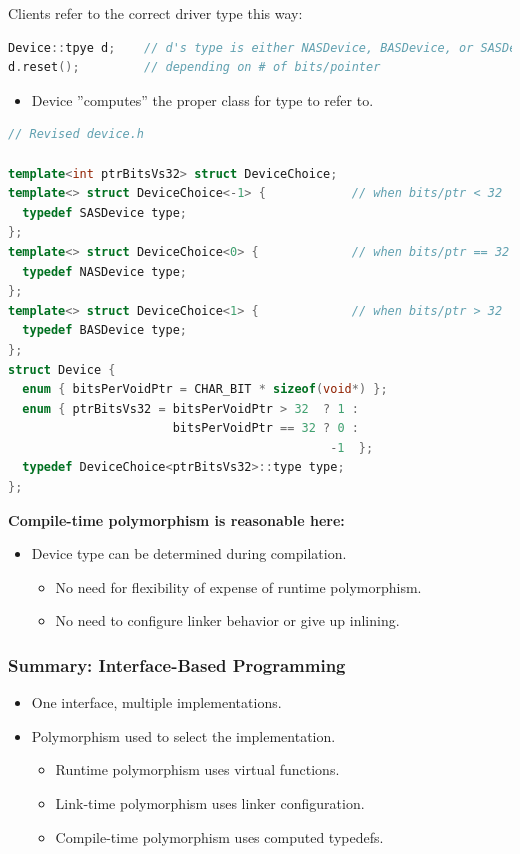 Clients refer to the correct driver type this way:
\begin{lstlisting}[language=C++]
Device::tpye d;    // d's type is either NASDevice, BASDevice, or SASDevice,
d.reset();         // depending on # of bits/pointer
\end{lstlisting}
\begin{itemize}
  \item Device ''computes'' the proper class for type to refer to.
\end{itemize}
\begin{lstlisting}[language=C++]
// Revised device.h

template<int ptrBitsVs32> struct DeviceChoice;
template<> struct DeviceChoice<-1> {            // when bits/ptr < 32
  typedef SASDevice type;
};
template<> struct DeviceChoice<0> {             // when bits/ptr == 32
  typedef NASDevice type;
};
template<> struct DeviceChoice<1> {             // when bits/ptr > 32
  typedef BASDevice type;
};
struct Device {
  enum { bitsPerVoidPtr = CHAR_BIT * sizeof(void*) };
  enum { ptrBitsVs32 = bitsPerVoidPtr > 32  ? 1 :
                       bitsPerVoidPtr == 32 ? 0 :
                                             -1  };
  typedef DeviceChoice<ptrBitsVs32>::type type;
};
\end{lstlisting}

\textbf{Compile-time polymorphism is reasonable here:}
\begin{itemize}
  \item Device type can be determined during compilation.
  \begin{itemize}
    \item No need for flexibility of expense of runtime polymorphism.
    \item No need to configure linker behavior or give up inlining.
  \end{itemize}
\end{itemize}

\subsubsection{Summary: Interface-Based Programming}
\begin{itemize}
  \item One interface, multiple implementations.
  \item Polymorphism used to select the implementation.
  \begin{itemize}
    \item Runtime polymorphism uses virtual functions.
    \item Link-time polymorphism uses linker configuration.
    \item Compile-time polymorphism uses computed typedefs.
  \end{itemize}
\end{itemize}

